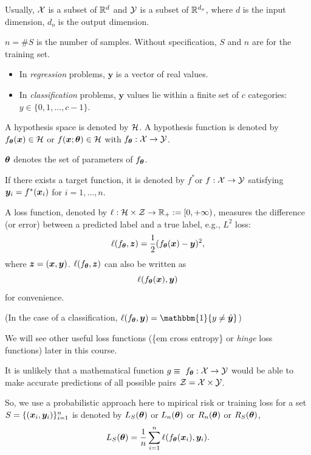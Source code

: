 \documentclass{beamer}
\begin{document}
\begin{frame}
  
  Usually,
  $\mathcal{X}$ is a subset of $\mathbb{R}^d$ and $\mathcal{Y}$ is a subset of $\mathbb{R}^{d_{o}}$, where $d$ is the input dimension, $d_{o}$ is the output dimension.
  
  $n=\#S$ is the number of samples. Without specification, $S$ and $n$ are for the training set. 

  \begin{itemize}
    \item In {\em regression} problems, $\mathbf{y}$ is a vector of real values.
    \item In {\em classification} problems, $\mathbf{y}$ values lie within a finite set of $c$ categories: $y\in\{0, 1, \ldots, c-1\}$.
  \end{itemize}


\end{frame}
  
\begin{frame}

  \begin{definition}  
  A hypothesis space is denoted by $\mathcal{H}$. A hypothesis function is denoted by $f_{\bm{\theta}}(\bm{x})\in\mathcal{H}$ or $f(\bm{x};\bm{\theta})\in\mathcal{H}$ with $f_{\bm{\theta}}:\mathcal{X}\to\mathcal{Y}$.
  \end{definition}
  
  $\bm{\theta}$  denotes the set of parameters of $f_{\bm{\theta}}$.
  
  If there exists a target function, it is denoted by $f^*$or $f:\mathcal{X}\to\mathcal{Y}$ satisfying $\bm{y}_i=f^*(\bm{x}_i)$ for $i=1,\ldots,n$.
  
  A loss function, denoted by $\ell:\mathcal{H}\times\mathcal{Z}\to\mathbb{R}_+:=[0,+\infty)$, measures the difference (or error) between a predicted label and a true label, e.g., $L^2$ loss:
  \[
      \ell(f_{\bm{\theta}},\bm{z})=\frac{1}{2}(f_{\bm{\theta}}(\bm{x})-\bm{y})^2,
  \]
  where $\bm{z}=(\bm{x},\bm{y})$. $\ell(f_{\bm{\theta}},\bm{z})$ can also be written as
  \[
      \ell(f_{\bm{\theta}}(\bm{x}),\bm{y})
  \]
  for convenience.
  
  (In the case of a classification, $\ell(f_{\vtheta},\vy)=\mathbbm{1}\{y\neq \hat{\vy}\}$)

\end{frame}
  
\begin{frame}
We will see other useful loss functions (\{em cross entropy\} or {\em hinge} loss functions) later in this course.

It is unlikely that a mathematical function $g \equiv \ f_{\bm{\theta}}:\mathcal{X}\to\mathcal{Y}$ would be able to make accurate predictions of all possible pairs $\mathcal{Z}=\mathcal{X}\times\mathcal{Y}$.

  So, we use a probabilistic approach here to mpirical risk or training loss for a set $S=\{(\bm{x}_i,\bm{y}_i)\}_{i=1}^{n}$ is denoted by  $L_S(\bm{\theta})$ or $L_{n}(\bm{\theta})$ or $R_{n}(\bm{\theta})$ or $R_{S}(\bm{\theta})$,
  \begin{equation}
      L_S(\bm{\theta}) =\frac{1}{n}\sum_{i=1}^n\ell(f_{\bm{\theta}}(\bm{x}_i),\bm{y}_i).
  \end{equation}
  
\end{frame}
  
\end{document}
